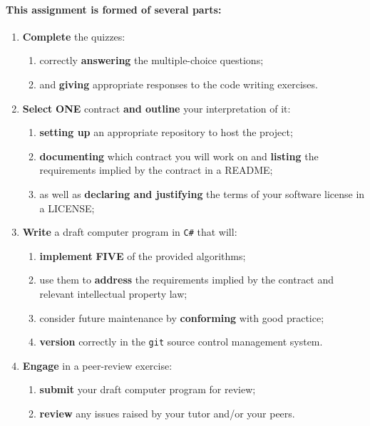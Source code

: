 \documentclass{../../fal_assignment}
\begin{document}
\paragraph{This assignment is formed of several parts:}

\begin{enumerate}
\setlength{\itemindent}{8pt}
    \item \textbf{Complete} the quizzes:
    	\begin{enumerate}
    		\item correctly \textbf{answering} the multiple-choice questions;
    		\item and \textbf{giving} appropriate responses to the code writing exercises.
	\end{enumerate}
    \item \textbf{Select} \textbf{ONE} contract \textbf{and outline} your interpretation of it:
    	\begin{enumerate}
    		\item \textbf{setting up} an appropriate repository to host the project;
    		\item \textbf{documenting} which contract you will work on and \textbf{listing} the requirements implied by the contract in a README;
    		\item as well as \textbf{declaring and justifying} the terms of your software license in a LICENSE;
	\end{enumerate}
    \item \textbf{Write} a draft computer program in \texttt{C\#} that will:
    	\begin{enumerate}
    		\item \textbf{implement} \textbf{FIVE} of the provided algorithms;
     		\item use them to \textbf{address} the requirements implied by the contract and relevant intellectual property law;
    		\item consider future maintenance by \textbf{conforming} with good practice;
    		\item \textbf{version} correctly in the \texttt{git} source control management system.
	\end{enumerate}
    \item \textbf{Engage} in a peer-review exercise:
    	\begin{enumerate}
    		\item \textbf{submit} your draft computer program for review;
    		\item \textbf{review} any issues raised by your tutor and/or your peers.

\end{enumerate}
\end{enumerate}
\end{document}
